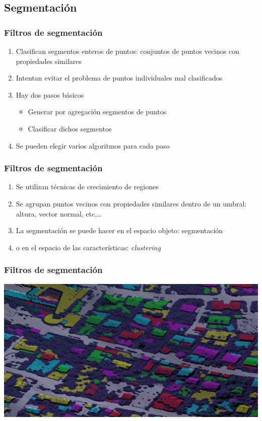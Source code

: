 \subsection{Segmentación}
\begin{frame}
  \frametitle{Filtros de segmentación}
  \begin{enumerate}
    \item Clasifican \alert{segmentos} enteros de puntos: conjuntos de puntos
      vecinos con propiedades similares
    \item Intentan evitar el problema de puntos individuales mal clasificados
    \item Hay dos pasos básicos
      \begin{itemize}
        \item Generar por agregación segmentos de puntos
        \item Clasificar dichos segmentos
      \end{itemize}
    \item Se pueden elegir varios algoritmos para cada paso
  \end{enumerate}
\end{frame}
\begin{frame}
  \frametitle{Filtros de segmentación}
  \begin{enumerate}
    \item Se utilizan técnicas de \alert{crecimiento de regiones}
    \item Se agrupan puntos vecinos con propiedades similares dentro de un
      umbral: altura, vector normal, etc,\ldots
    \item La segmentación se puede hacer en el espacio objeto:
      \alert{segmentación}
    \item o en el espacio de las características: \alert{\emph{clustering}}
  \end{enumerate}
\end{frame}
\begin{frame}
  \frametitle{Filtros de segmentación}
  \begin{center}
    \includegraphics[height=0.70\textheight]{images/clustering}
  \end{center}
\end{frame}
